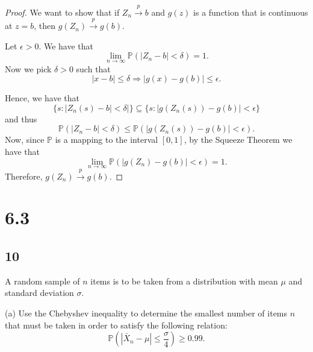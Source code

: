 \documentclass{article}
\renewcommand{\P}[1]{\mathbb{P}\left(#1\right)}
\begin{document}
\begin{proof}
    We want to show that if $Z_n \stackrel{p}{\to} b$ and $g(z)$ is a function that is
    continuous at $z = b$, then $g(Z_n) \stackrel{p}{\to} g(b)$.

    Let $\epsilon > 0$. We have that
    \begin{equation*}
        \lim_{n\to\infty} \P{|Z_n - b| < \delta} = 1.
    \end{equation*}
    Now we pick $\delta > 0$ such that
    \begin{equation*}
        |x - b| \leq \delta \Rightarrow |g(x) - g(b)| \leq \epsilon.
    \end{equation*}

    Hence, we have that
    \begin{equation*}
        \{s: |Z_n(s) - b| < \delta|\} \subseteq \{s: |g(Z_n(s)) - g(b)| < \epsilon\}
    \end{equation*}
    and thus
    \begin{equation*}
        \P{|Z_n - b| < \delta} \leq \P{|g(Z_n(s)) - g(b)| < \epsilon}.
    \end{equation*}
    Now, since $\mathbb{P}$ is a mapping to the interval $[0,1]$, by the Squeeze Theorem
    we have that
    \begin{equation*}
        \lim_{n\to\infty} \P{|g(Z_n) - g(b)| < \epsilon} = 1.
    \end{equation*}
    Therefore, $g(Z_n) \stackrel{p}{\to} g(b)$.
\end{proof}

\section*{6.3}
\subsection*{10}
A random sample of $n$ items is to be taken from a distribution with mean $\mu$ and
standard deviation $\sigma$.

(a) Use the Chebyshev inequality to determine the smallest
number of items $n$ that must be taken in order to satisfy the following relation:
\begin{equation*}
    \P{|\bar{X}_n - \mu| \leq \frac{\sigma}{4}}\geq 0.99.
\end{equation*}
\end{document}
